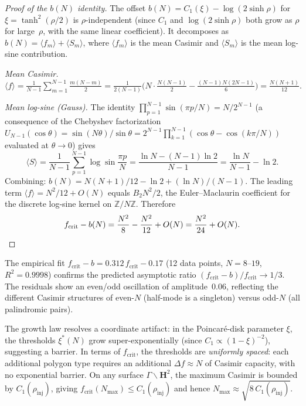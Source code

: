 \begin{proof}[Proof of the $b(N)$ identity]
The offset $b(N) = C_1(\xi) - \log(2\sinh\rho)$ for
$\xi = \tanh^2(\rho/2)$ is $\rho$-independent (since $C_1$ and
$\log(2\sinh\rho)$ both grow as $\rho$ for large~$\rho$, with
the same linear coefficient).
It decomposes as $b(N) = \langle f_m\rangle + \langle S_m\rangle$,
where $\langle f_m\rangle$ is the mean Casimir and
$\langle S_m\rangle$ is the mean log-sine contribution.

\emph{Mean Casimir.}
$\langle f\rangle = \frac{1}{N{-}1}\sum_{m=1}^{N-1}
\frac{m(N{-}m)}{2}
= \frac{1}{2(N{-}1)}\bigl(N\cdot\frac{N(N{-}1)}{2}
  - \frac{(N{-}1)N(2N{-}1)}{6}\bigr)
= \frac{N(N{+}1)}{12}.$

\emph{Mean log-sine (Gauss).}
The identity $\prod_{p=1}^{N-1}\sin(\pi p/N) = N/2^{N-1}$
(a consequence of the Chebyshev factorization
$U_{N-1}(\cos\theta) = \sin(N\theta)/\sin\theta
= 2^{N-1}\prod_{k=1}^{N-1}(\cos\theta - \cos(k\pi/N))$
evaluated at $\theta \to 0$) gives
\[
  \langle S\rangle
  = \frac{1}{N{-}1}\sum_{p=1}^{N-1}\log\sin\frac{\pi p}{N}
  = \frac{\ln N - (N{-}1)\ln 2}{N{-}1}
  = \frac{\ln N}{N{-}1} - \ln 2.
\]
Combining: $b(N) = N(N{+}1)/12 - \ln 2 + (\ln N)/(N{-}1)$.
The leading term $\langle f\rangle = N^2/12 + O(N)$ equals
$B_2 N^2/2$, the Euler--Maclaurin coefficient for the discrete
log-sine kernel on $\mathbb{Z}/N\mathbb{Z}$.
Therefore
\[
  f_{\mathrm{crit}} - b(N)
  = \frac{N^2}{8} - \frac{N^2}{12} + O(N)
  = \frac{N^2}{24} + O(N). \qedhere
\]
\end{proof}

\noindent
The empirical fit
$f_{\mathrm{crit}} - b = 0.312\,f_{\mathrm{crit}} - 0.17$
(12 data points, $N = 8$--$19$, $R^2 = 0.9998$) confirms the
predicted asymptotic ratio $(f_{\mathrm{crit}} - b)/f_{\mathrm{crit}}
\to 1/3$.
The residuals show an even/odd oscillation of amplitude~$0.06$,
reflecting the different Casimir structures of even-$N$
(half-mode is a singleton) versus odd-$N$ (all palindromic pairs).

The growth law resolves a coordinate artifact:
in the Poincar\'e-disk parameter $\xi$, the thresholds
$\xi^*(N)$ grow super-exponentially (since $C_1 \propto (1{-}\xi)^{-2}$),
suggesting a barrier.
In terms of $f_{\mathrm{crit}}$, the thresholds are \emph{uniformly spaced}:
each additional polygon type requires an additional $\Delta f \approx N$
of Casimir capacity, with no exponential barrier.
On any surface $\Gamma\backslash\mathbf{H}^2$, the maximum Casimir
is bounded by $C_1(\rho_{\mathrm{inj}})$, giving
$f_{\mathrm{crit}}(N_{\max}) \le C_1(\rho_{\mathrm{inj}})$ and hence
$N_{\max} \approx \sqrt{8\,C_1(\rho_{\mathrm{inj}})}$.

